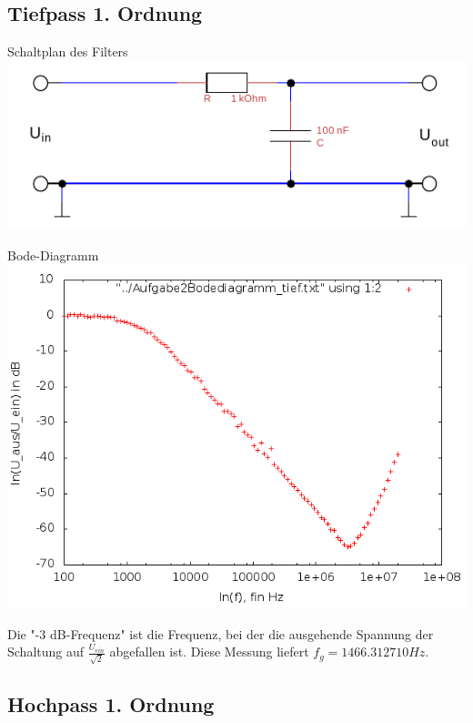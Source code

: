 \documentclass[compress,11pt]{beamer}
\begin{document}
\subsection{Tiefpass 1. Ordnung}
\begin{frame}
\begin{block}{Schaltplan des Filters}
\includegraphics[width=\textwidth]{../daten/Messdaten/plots/schalt_tief}
\end{block}
\end{frame}
\begin{frame}\begin{block}{Bode-Diagramm}
\includegraphics[width=\textwidth]{../daten/Messdaten/plots/Aufgabe2Bodediagramm_tief_gain}
\end{block}
\end{frame}
\begin{frame}
Die "-3 dB-Frequenz" ist die Frequenz, bei der die ausgehende Spannung der Schaltung auf $\frac{U_{ein}}{\sqrt{2}}$ abgefallen ist. Diese Messung liefert $f_g = 1466.312710 Hz$.
\end{frame}


\subsection{Hochpass 1. Ordnung}
\end{document}
